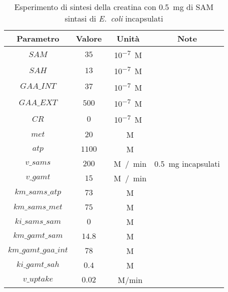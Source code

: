 \begin{table}[H]
	\centering
	\begin{tabular}{| c | c | c | c |}
	\hline
	Parametro & Valore & Unit\`a & Note \\
		\hline
		$SAM$ & $35$ & \si{10^{-7} M} & \\
		\hline
		$SAH$ & $13$ & \si{10^{-7} M} & \\
		\hline
		$GAA\_INT$ & $37$ & \si{10^{-7} M} & \\
		\hline
		$GAA\_EXT$ & $500$ & \si{10^{-7} M} & \\
		\hline
		$CR$ & $0$ & \si{10^{-7} M} & \\
		\hline
		$met$ & $20$ & \si{\mu M} & \\
		\hline
		$atp$ & $1100$ & \si{\mu M} & \\
		\hline
		$v\_sams$ & $200$ & \si{\mu M / min} & \SI{0.5}{mg} incapsulati \\
		\hline
		$v\_gamt$ & $15$ & \si{\mu M / min} & \\
		\hline
		$km\_sams\_atp$ & $73$ & \si{\mu M} & \\
		\hline
		$km\_sams\_met$ & $75$ & \si{\mu M} & \\
		\hline
		$ki\_sams\_sam$ & $0$ & \si{\mu M} & \\
		\hline
		$km\_gamt\_sam$ & $14.8$ & \si{\mu M} & \\
		\hline
		$km\_gamt\_gaa\_int$ & $78$ & \si{\mu M} & \\
		\hline
		$ki\_gamt\_sah$ & $0.4$ & \si{\mu M} & \\
		\hline
		$v\_uptake$ & $0.02$ & \si{\mu M/min} & \\
		\hline
	\end{tabular}
	\caption{Esperimento di sintesi della creatina con \SI{0.5}{mg} di SAM sintasi di \emph{E.\ coli} incapsulati}
	\label{mod:11}
\end{table}


